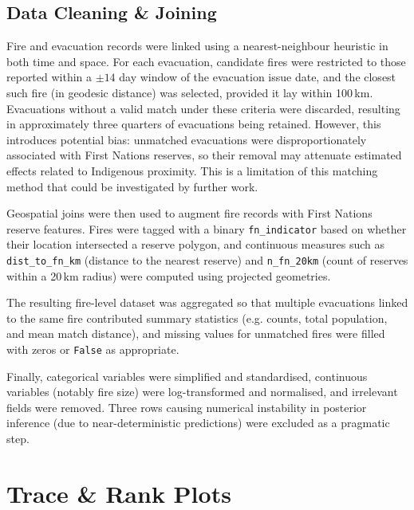 \subsection{Data Cleaning \& Joining}

Fire and evacuation records were linked using a nearest-neighbour heuristic in both time and space. For each evacuation, candidate fires were restricted to those reported within a $\pm14$ day window of the evacuation issue date, and the closest such fire (in geodesic distance) was selected, provided it lay within 100\,km. Evacuations without a valid match under these criteria were discarded, resulting in approximately three quarters of evacuations being retained. However, this introduces potential bias: unmatched evacuations were disproportionately associated with First Nations reserves, so their removal may attenuate estimated effects related to Indigenous proximity. This is a limitation of this matching method that could be investigated by further work.

Geospatial joins were then used to augment fire records with First Nations reserve features. Fires were tagged with a binary \texttt{fn\_indicator} based on whether their location intersected a reserve polygon, and continuous measures such as \texttt{dist\_to\_fn\_km} (distance to the nearest reserve) and \texttt{n\_fn\_20km} (count of reserves within a 20\,km radius) were computed using projected geometries.

The resulting fire-level dataset was aggregated so that multiple evacuations linked to the same fire contributed summary statistics (e.g. counts, total population, and mean match distance), and missing values for unmatched fires were filled with zeros or \texttt{False} as appropriate.

Finally, categorical variables were simplified and standardised, continuous variables (notably fire size) were log-transformed and normalised, and irrelevant fields were removed. Three rows causing numerical instability in posterior inference (due to near-deterministic predictions) were excluded as a pragmatic step.

\section{Trace \& Rank Plots}